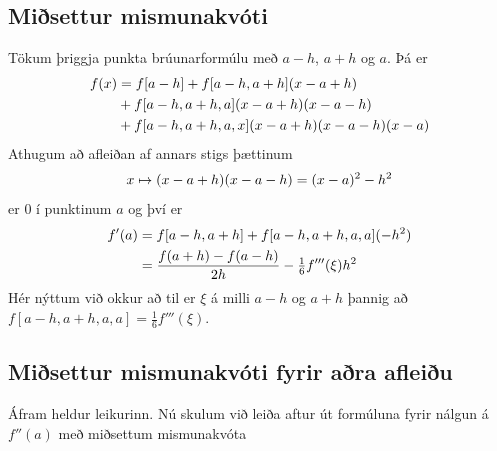\documentclass[A4paper,10pt,icelandic]{sphinxmanual}
\begin{document}
\subsection{Miðsettur mismunakvóti}
\label{kafli04:id3}
Tökum þriggja punkta brúunarformúlu með \(a-h\), \(a+h\) og
\(a\). Þá er
\begin{gather}
\begin{split}\begin{aligned}
  f(x)&=f[a-h]+f[a-h,a+h](x-a+h)\\
  &+f[a-h,a+h,a](x-a+h)(x-a-h)\\
  &+f[a-h,a+h,a,x](x-a+h)(x-a-h)(x-a)\end{aligned}\end{split}\notag
\end{gather}
Athugum að afleiðan af annars stigs þættinum
\begin{gather}
\begin{split}x\mapsto (x-a+h)(x-a-h)=(x-a)^2-h^2\end{split}\notag
\end{gather}
er \(0\) í punktinum \(a\) og því er
\begin{gather}
\begin{split}\begin{aligned}
  f'(a)&=f[a-h,a+h]+f[a-h,a+h,a,a](-h^2)\\
  &=\dfrac{f(a+h)-f(a-h)}{2h}-\tfrac 16 f'''(\xi)h^2 \end{aligned}\end{split}\notag
\end{gather}
Hér nýttum við okkur að til er \(\xi\) á milli \(a-h\) og
\(a+h\) þannig að \(f[a-h,a+h,a,a]=\tfrac 16 f'''(\xi)\).


\subsection{Miðsettur mismunakvóti fyrir aðra afleiðu}
\label{kafli04:id4}
Áfram heldur leikurinn. Nú skulum við leiða aftur út formúluna fyrir
nálgun á \(f''(a)\) með miðsettum mismunakvóta
\end{document}
